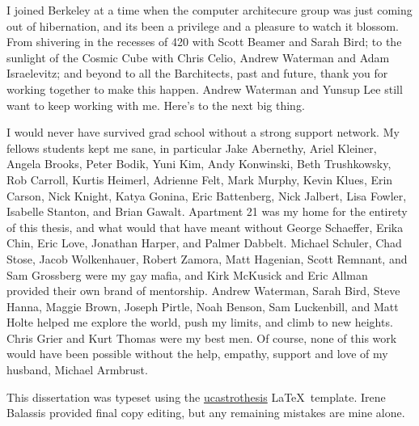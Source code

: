 \documentclass[12pt]{myucthesis}
\begin{document}
\begin{frontmatter}
\begin{acknowledgements}
I joined Berkeley at a time when the computer architecure group was just coming out of hibernation,
and its been a privilege and a pleasure to watch it blossom.
From shivering in the recesses of 420 with Scott Beamer and Sarah Bird;
to the sunlight of the Cosmic Cube with Chris Celio, Andrew Waterman and Adam Israelevitz;
and beyond to all the Barchitects, past and future, thank you for working together to make this happen.
Andrew Waterman and Yunsup Lee still want to keep working with me.
Here's to the next big thing.

I would never have survived grad school without a strong support network.
My fellows students kept me sane, in particular
Jake Abernethy, Ariel Kleiner, Angela Brooks, Peter Bodik, Yuni Kim,
Andy Konwinski, Beth Trushkowsky, Rob Carroll, Kurtis Heimerl, Adrienne Felt, Mark Murphy,
Kevin Klues, Erin Carson, Nick Knight, Katya Gonina, Eric Battenberg, Nick Jalbert,
Lisa Fowler, Isabelle Stanton, and Brian Gawalt.
Apartment 21 was my home for the entirety of this thesis, and what would that have meant without
George Schaeffer, Erika Chin, Eric Love, Jonathan Harper, and Palmer Dabbelt.
Michael Schuler, Chad Stose, Jacob Wolkenhauer, Robert Zamora, Matt Hagenian,
Scott Remnant, and Sam Grossberg were my gay mafia, and 
Kirk McKusick and Eric Allman provided their own brand of mentorship.
Andrew Waterman, Sarah Bird, Steve Hanna, Maggie Brown, Joseph Pirtle, Noah Benson, Sam Luckenbill, and Matt Holte
helped me explore the world, push my limits, and climb to new heights.
Chris Grier and Kurt Thomas were my best men.
Of course, none of this work would have been possible without the help, empathy,  support and love
 of my husband, Michael Armbrust.


This dissertation was typeset using the
\href{https://github.com/pkgw/ucastrothesis}{\textsf{ucastrothesis}}
\LaTeX\ template.
Irene Balassis provided final copy editing, but any remaining mistakes are mine alone.

\end{acknowledgements}
\end{frontmatter}








{}
\end{document}
